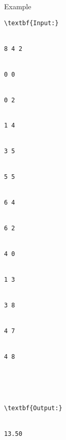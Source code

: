 Example
\begin{verbatim}
\textbf{Input:}


8 4 2


0 0


0 2


1 4


3 5


5 5


6 4


6 2


4 0


1 3


3 8


4 7


4 8





\textbf{Output:}


13.50


\end{verbatim}